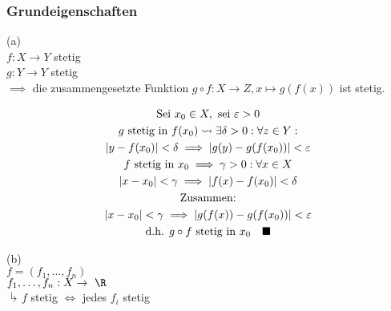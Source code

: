 \subsubsection{Grundeigenschaften}
(a)\\
$f: X \rightarrow Y$ stetig \\
$g: Y \rightarrow Y$ stetig \\
$\implies$ die zusammengesetzte Funktion $g \circ f: X \rightarrow Z , x \mapsto g(f(x))$ ist stetig.\\
\begin{bew}
	\begin{gather*}
		\text{Sei } x_0 \in X, \text{ sei } \epsilon > 0 \\
		g \text{ stetig in } f(x_0) \rightsquigarrow \exists \delta > 0 : \forall z \in Y: \\
		\abs{y - f(x_0)} < \delta \implies \abs{g(y) - g(f(x_0))} < \epsilon \\
		f \text{ stetig in } x_0 \implies \gamma > 0 : \forall x \in X \\
		\abs{x - x_0} < \gamma \implies \abs{f(x) - f(x_0)} < \delta \\
		\text{Zusammen:} \\
		\abs{x - x_0} < \gamma \implies \abs{g(f(x)) - g(f(x_0))} < \epsilon \\
		\text{d.h. } g \circ f \text{ stetig in } x_0 \quad \blacksquare
	\end{gather*}
\end{bew}

(b)\\
$f = (f_1 , \dotsc , f_n)$\\
$f_1 , \dotsc , f_n : X \rightarrow \R$\\
$\drsh f$ stetig $\iff$ jedes $f_i$ stetig

